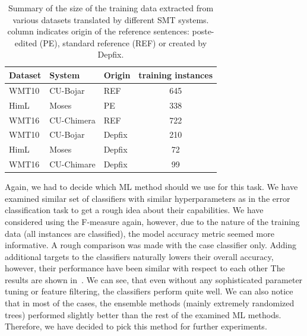 \begin{table}[t]
\centering
\small

\begin{tabular}{lll|c}
Dataset  &  System  &  Origin  &  \hash{} training instances  \\
\hline
WMT10  &  CU-Bojar  &  REF  &  645  \\
HimL  &   Moses  &  PE  & 338  \\
WMT16  &  CU-Chimera  &  REF  &  722  \\
WMT10  &  CU-Bojar  &  Depfix  &  210  \\
HimL  &  Moses  &  Depfix  &  72  \\
WMT16  &  CU-Chimare  &  Depfix  &  99  \\
\end{tabular}
\caption[Summary of the extracted Czech training data for morphological prediction]{
    Summary of the size of the training data extracted from various datasets translated by different SMT systems.
	 column indicates origin
	of the reference sentences: poste-edited (PE), standard reference (REF) or created by Depfix.
}
\label{cats-training-sum}
\end{table}

Again, we had to decide which ML method should we use for this task. 
We have examined similar set of classifiers with similar
hyperparameters as in the error classification task to get a rough idea about their capabilities.
We have considered using the F-measure again, however, due to the nature of the training data (all
instances are classified), the model accuracy metric seemed more informative.
A rough comparison was made with the case classifier only.
Adding additional targets to the classifiers naturally lowers their overall accuracy,
however, their performance have been similar with respect to each other
The results are shown in~. We can see, that even without any sophisticated parameter
tuning or feature filtering, the classifiers perform quite well. We can also notice that in most of the cases, the ensemble
methods (mainly extremely randomized trees) performed slightly better than the rest of the examined ML methods. Therefore, we have decided
to pick this method for further experiments.

